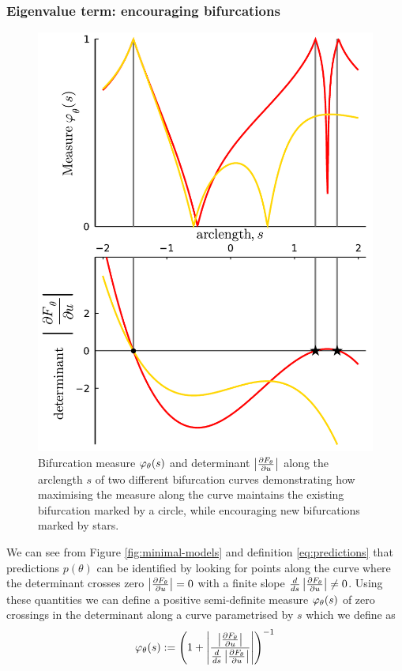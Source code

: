 \documentclass{article}
\begin{document}
\subsubsection{Eigenvalue term: encouraging bifurcations}
\begin{figure}
    \centering
    \includegraphics[width=\linewidth]{bifurcation-measure}
    \caption{Bifurcation measure $\varphi_{\theta}(s)$ and determinant $\left| \frac{\partial F_{\theta}}{\partial u} \right|$ along the arclength $s$ of two different bifurcation curves demonstrating how maximising the measure along the curve maintains the existing bifurcation marked by a circle, while encouraging new bifurcations marked by stars.}
    \label{fig:measure}
\end{figure}

We can see from Figure \ref{fig:minimal-models} and definition \eqref{eq:predictions} that predictions $p(\theta)$ can be identified by looking for points along the curve where the determinant crosses zero $\left| \frac{\partial F_{\theta}}{\partial u} \right|=0$ with a finite slope $\frac{d}{ds}\left| \frac{\partial F_{\theta}}{\partial u} \right|\neq 0$. Using these quantities we can define a positive semi-definite measure $\varphi_{\theta}(s)$ of zero crossings in the determinant along a curve parametrised by $s$ which we define as 
\begin{equation}
    \varphi_{\theta}(s):=
    \left(1+\left|\frac{\left| \frac{\partial F_{\theta}}{\partial u} \right|}{\frac{d}{ds}\left| \frac{\partial F_{\theta}}{\partial u} \right|}\right|\right)^{-1}
    \label{eq:measure}
\end{equation}
\end{document}
